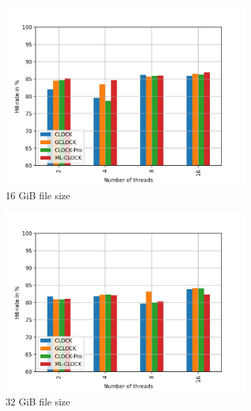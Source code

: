 \documentclass[
	12pt,
	a4paper,
	abstract,
	bibliography=totoc,
	chapterprefix,
	headings=openright,
	numbers=endperiod,
	parskip=half,
	twoside,
]{scrreprt}
\begin{document}
\begin{figure}[H]
	\centering
	\begin{subfigure}{0.4\textwidth}
		\includegraphics[width=\textwidth]{multi_16_gb_rw_50to50_normal.jpg}		
		\caption{16 GiB file size}
		\label{fig:rw_90to10  zipf}
	\end{subfigure}
	\hfill
	\begin{subfigure}{0.4\textwidth}
		\includegraphics[width=\textwidth]{multi_32_gb_rw_50to50_normal.jpg}		
		\caption{32 GiB file size}
		\label{fig:rw_90to10  normal}
	\end{subfigure}
	\hfill
	\begin{subfigure}{0.4\textwidth}

\end{subfigure}
\end{figure}
\end{document}
